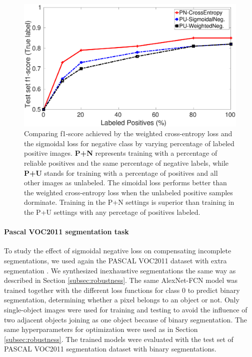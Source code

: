 \begin{figure}[t]
\centering
   \includegraphics[width=1.05\linewidth]{img/pu_vs_pn}
\caption{
Comparing f1-score achieved by the weighted cross-entropy loss and the sigmoidal loss for negative class by varying percentage of labeled positive images.
\textbf{P+N} represents training with a percentage of reliable positives and the same percentage of negative labels, while \textbf{P+U} stands for training with a percentage of positives and all other images as unlabeled.
The simoidal loss performs better than the weighted cross-entropy loss when the unlabeled positive samples dorminate.
Training in the P+N settings is superior than training in the P+U settings with any percetage of positives labeled.
}
\label{fig:pct_annotating}
\end{figure}

\paragraph{Pascal VOC2011 segmentation task}

To study the effect of sigmoidal negative loss on compensating incomplete segmentations, we used again the PASCAL VOC2011 dataset with extra segmentation \cite{hariharan2011semantic}.
We synthesized inexhaustive segmentations the same way as described in Section \ref{subsec:robustness}.
The same AlexNet-FCN model was trained together with the different loss functions for class 0 to predict binary segmentation, determining whether a pixel belongs to an object or not.
Only single-object images were used for training and testing to avoid the influence of two adjacent objects joining as one object because of binary segmentation.
The same hyperparameters for optimization were used as in Section \ref{subsec:robustness}.
The trained models were evaluated with the test set of PASCAL VOC2011 segmentation dataset with binary segmentations.

